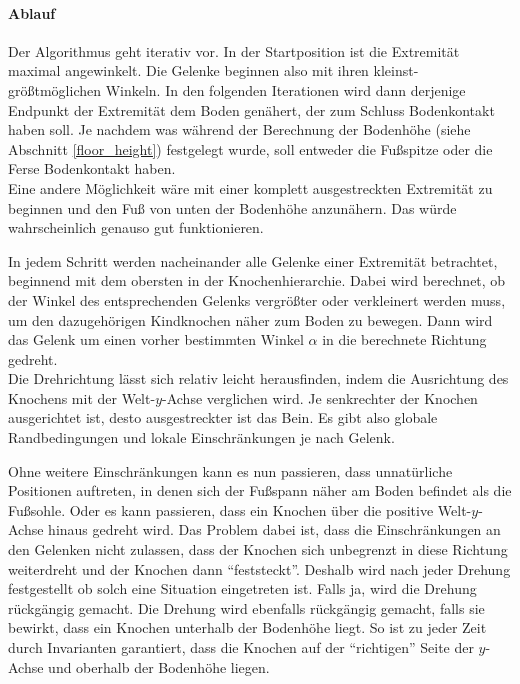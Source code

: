 \paragraph{Ablauf}
Der Algorithmus geht iterativ vor.
In der Startposition ist die Extremität maximal angewinkelt. Die Gelenke beginnen also mit ihren kleinst- \bzw größtmöglichen Winkeln. In den folgenden Iterationen wird dann derjenige Endpunkt der Extremität dem Boden genähert, der zum Schluss Bodenkontakt haben soll. Je nachdem was während der Berechnung der Bodenhöhe (siehe Abschnitt \ref{floor_height}) festgelegt wurde, soll entweder die Fußspitze oder die Ferse Bodenkontakt haben.\\
Eine andere Möglichkeit wäre mit einer komplett ausgestreckten Extremität zu beginnen und den Fuß von unten der Bodenhöhe anzunähern. Das würde wahrscheinlich genauso gut funktionieren.

In jedem Schritt werden nacheinander alle Gelenke einer Extremität betrachtet, beginnend mit dem obersten in der Knochenhierarchie. Dabei wird berechnet, ob der Winkel des entsprechenden Gelenks vergrößter oder verkleinert werden muss, um den dazugehörigen Kindknochen näher zum Boden zu bewegen. Dann wird das Gelenk um einen vorher bestimmten Winkel $\alpha$ in die berechnete Richtung gedreht.\\
Die Drehrichtung lässt sich relativ leicht herausfinden, indem die Ausrichtung des Knochens mit der Welt-$y$-Achse verglichen wird. Je senkrechter der Knochen ausgerichtet ist, desto ausgestreckter ist das Bein.
Es gibt also globale Randbedingungen und lokale Einschränkungen je nach Gelenk. %

Ohne weitere Einschränkungen kann es nun passieren, dass unnatürliche Positionen auftreten, in denen sich \zb der Fußspann näher am Boden befindet als die Fußsohle.
Oder es kann passieren, dass ein Knochen über die positive Welt-$y$-Achse hinaus gedreht wird. Das Problem dabei ist, dass die Einschränkungen an den Gelenken nicht zulassen, dass der Knochen sich unbegrenzt in diese Richtung weiterdreht und der Knochen dann "`feststeckt"'. Deshalb wird nach jeder Drehung festgestellt ob solch eine Situation eingetreten ist. Falls ja, wird die Drehung rückgängig gemacht.
Die Drehung wird ebenfalls rückgängig gemacht, falls sie bewirkt, dass ein Knochen unterhalb der Bodenhöhe liegt.
So ist zu jeder Zeit durch Invarianten garantiert, dass die Knochen auf der "`richtigen"' Seite der $y$-Achse und oberhalb der Bodenhöhe liegen.


